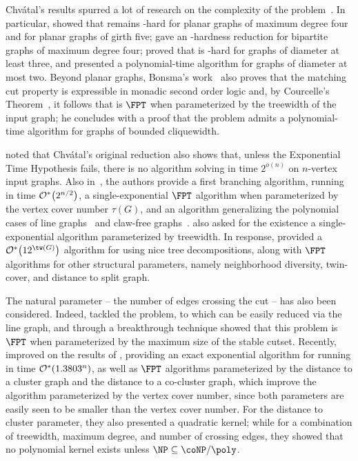 Chvátal's results spurred a lot of research on the complexity of the problem~\citep{matching_cut_ipec,matching_cut_structural,matching_cut_tcs, matching_cut_diameter, matching_cut_planar, matching_cut_series_parallel, stable_cutset_line_graphs}.
In particular, \cite{matching_cut_planar} showed that  remains \NP-hard for planar graphs of maximum degree four and for planar graphs of girth five;
\cite{stable_cutset_line_graphs} gave an \NP-hardness reduction for bipartite graphs of maximum degree four;
\cite{matching_cut_diameter} proved that  is \NP-hard for graphs of diameter at least three, and presented a polynomial-time algorithm for graphs of diameter at most two.
Beyond planar graphs, Bonsma's work~\citep{matching_cut_planar} also proves that the matching cut property is expressible in monadic second order logic and, by Courcelle's Theorem~\citep{courcelle_theorem}, it follows that  is $\FPT$ when parameterized by the treewidth of the input graph; he concludes with a proof that the problem admits a polynomial-time algorithm for graphs of bounded cliquewidth.

\cite{matching_cut_tcs} noted that Chv\'atal's original reduction also shows that, unless the Exponential Time Hypothesis fails, there is no algorithm solving  in time $2^{o(n)}$ on $n$-vertex input graphs.
Also in~\citep{matching_cut_tcs}, the authors provide a first branching algorithm, running in time $\mathcal{O}^*\!\left(2^{n/2}\right)$, a single-exponential $\FPT$ algorithm when parameterized by the vertex cover number $\tau(G)$, and an algorithm generalizing the polynomial cases of line graphs~\citep{matching_cut_moshi} and claw-free graphs~\citep{matching_cut_planar}.
\cite{matching_cut_tcs} also asked for the existence a single-exponential algorithm parameterized by treewidth.
In response, \cite{matching_cut_structural} provided a $\bigOs{12^{\tw(G)}}$ algorithm for  using nice tree decompositions, along with $\FPT$ algorithms for other structural parameters, namely neighborhood diversity, twin-cover, and distance to split graph.

The natural parameter -- the number of edges crossing the cut -- has also been considered.
Indeed, \cite{marx_treewidth_reduction} tackled the  problem, to which  can be easily reduced via the line graph, and through a breakthrough technique showed that this problem is $\FPT$ when parameterized by the maximum size of the stable cutset.
Recently, \cite{matching_cut_ipec} improved on the results of \cite{matching_cut_tcs}, providing an exact exponential algorithm for  running in  time $\mathcal{O}^*\!\left(1.3803^n\right)$, as well as $\FPT$ algorithms parameterized by the distance to a cluster graph and the distance to a co-cluster graph, which improve the algorithm parameterized by the vertex cover number, since both parameters are easily seen to be smaller than the vertex cover number.
For the distance to cluster parameter, they also presented a quadratic kernel; while for a combination of treewidth, maximum degree, and number of crossing edges, they showed that no polynomial kernel exists unless $\NP \subseteq \coNP/\poly$.

